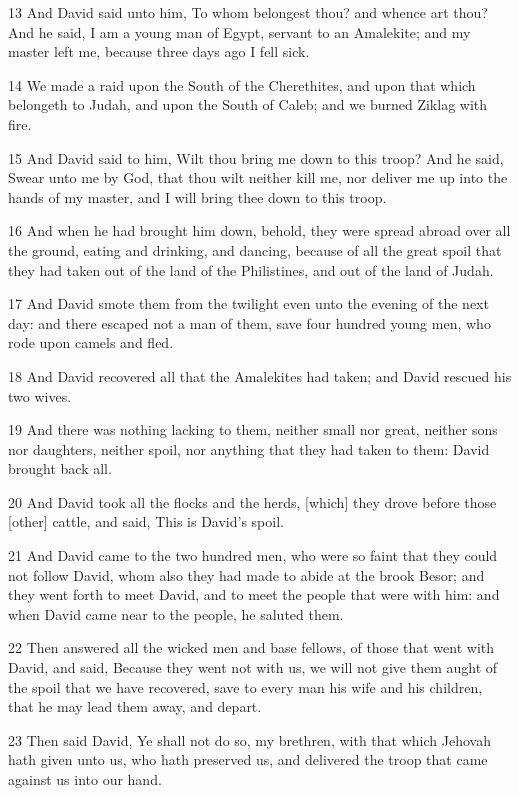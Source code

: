 \par 13 And David said unto him, To whom belongest thou? and whence art thou? And he said, I am a young man of Egypt, servant to an Amalekite; and my master left me, because three days ago I fell sick.
\par 14 We made a raid upon the South of the Cherethites, and upon that which belongeth to Judah, and upon the South of Caleb; and we burned Ziklag with fire.
\par 15 And David said to him, Wilt thou bring me down to this troop? And he said, Swear unto me by God, that thou wilt neither kill me, nor deliver me up into the hands of my master, and I will bring thee down to this troop.
\par 16 And when he had brought him down, behold, they were spread abroad over all the ground, eating and drinking, and dancing, because of all the great spoil that they had taken out of the land of the Philistines, and out of the land of Judah.
\par 17 And David smote them from the twilight even unto the evening of the next day: and there escaped not a man of them, save four hundred young men, who rode upon camels and fled.
\par 18 And David recovered all that the Amalekites had taken; and David rescued his two wives.
\par 19 And there was nothing lacking to them, neither small nor great, neither sons nor daughters, neither spoil, nor anything that they had taken to them: David brought back all.
\par 20 And David took all the flocks and the herds, [which] they drove before those [other] cattle, and said, This is David's spoil.
\par 21 And David came to the two hundred men, who were so faint that they could not follow David, whom also they had made to abide at the brook Besor; and they went forth to meet David, and to meet the people that were with him: and when David came near to the people, he saluted them.
\par 22 Then answered all the wicked men and base fellows, of those that went with David, and said, Because they went not with us, we will not give them aught of the spoil that we have recovered, save to every man his wife and his children, that he may lead them away, and depart.
\par 23 Then said David, Ye shall not do so, my brethren, with that which Jehovah hath given unto us, who hath preserved us, and delivered the troop that came against us into our hand.
